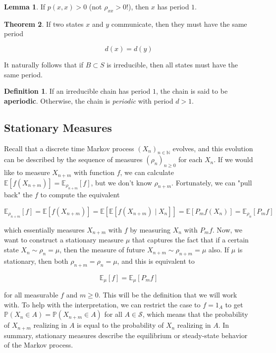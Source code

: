 \documentclass{article}
\theoremstyle{definition}
\newtheorem{theorem}{Theorem}[section]
\newtheorem{lemma}[theorem]{Lemma}
\theoremstyle{remark}
\theoremstyle{definition}
\newtheorem{definition}{Definition}[section]
\begin{document}
      \begin{lemma}
        If $p(x, x) > 0$ (not $\rho_{xx} > 0$!), then $x$ has period $1$. 
      \end{lemma}

      \begin{theorem}
        If two states $x$ and $y$ communicate, then they must have the same period

          \[d(x) = d(y)\]

        It naturally follows that if $B \subset S$ is irreducible, then all states must have the same period. 
      \end{theorem}

      \begin{definition}
        If an irreducible chain has period $1$, the chain is said to be \textbf{aperiodic}. Otherwise, the chain is \textit{periodic} with period $d > 1$. 
      \end{definition}

  \subsection{Stationary Measures}

    Recall that a discrete time Markov process $(X_n)_{n \in \mathbb{N}}$ evolves, and this evolution can be described by the sequence of measures $(\rho_n)_{n \geq 0}$ for each $X_n$. If we would like to measure $X_{n + m}$ with function $f$, we can calculate $\mathbb{E}[f(X_{n + m})] = \mathbb{E}_{\rho_{n + m}} [f]$, but we don't know $\rho_{n + m}$. Fortunately, we can "pull back" the $f$ to compute the equivalent 

      \[\mathbb{E}_{\rho_{n + m}} [f] = \mathbb{E}[f(X_{n + m})] = \mathbb{E}[\mathbb{E}[ f(X_{n + m}) \mid X_n]] = \mathbb{E}[P_m f (X_n)] = \mathbb{E}_{\rho_{n}} [ P_m f] \]

    which essentially measures $X_{n + m}$ with $f$ by measuring $X_n$ with $P_m f$. Now, we want to construct a stationary measure $\mu$ that captures the fact that if a certain state $X_n \sim \rho_n = \mu$, then the measure of future $X_{n + m} \sim \rho_{n + m} = \mu$ also. If $\mu$ is stationary, then both $\rho_{n + m} = \rho_n = \mu$, and this is equivalent to

      \[\mathbb{E}_\mu [f] = \mathbb{E}_\mu [P_m f]\]

    for all measurable $f$ and $m \geq 0$. This will be the definition that we will work with. To help with the interpretation, we can restrict the case to $f = 1_A$ to get $\mathbb{P}(X_n \in A) = \mathbb{P}(X_{n + m} \in A)$ for all $A \in \mathcal{S}$, which means that the probability of $X_{n + m}$ realizing in $A$ is equal to the probability of $X_n$ realizing in $A$. In summary, stationary measures describe the equilibrium or steady-state behavior of the Markov process.  
\end{document}
